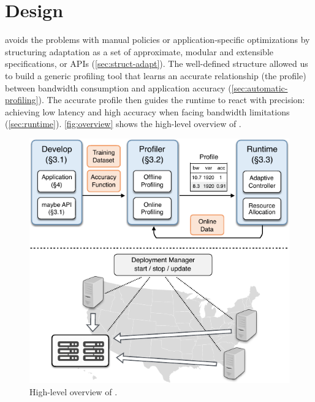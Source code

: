 \section{\sysname{} Design}
\label{sec:system}

\sysname{} avoids the problems with manual policies or application-specific
optimizations by structuring adaptation as a set of approximate, modular and
extensible specifications, or APIs (\autoref{sec:struct-adapt}). The
well-defined structure allowed us to build a generic profiling tool that learns
an accurate relationship (the profile) between bandwidth consumption and
application accuracy (\autoref{sec:automatic-profiling}). The accurate profile
then guides the runtime to react with precision: achieving low latency and high
accuracy when facing bandwidth limitations
(\autoref{sec:runtime}). \autoref{fig:overview} shows the high-level overview of
\sysname{}.

\begin{figure}
  \centering
  \includegraphics[width=0.8\linewidth]{figures/system.pdf}
  \caption{High-level overview of \sysname{}.}
  \label{fig:overview}
\end{figure}





